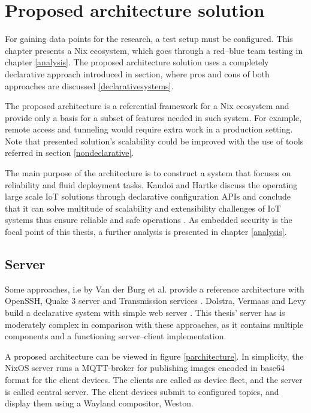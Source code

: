 \chapter{Proposed architecture solution} \label{architecture}

For gaining data points for the research, a test setup must be
configured. This chapter presents a Nix ecosystem, which goes through
a red–blue team testing in chapter \ref{analysis}. The proposed
architecture solution uses a completely declarative approach
introduced in section, where pros and cons of both approaches are
discussed \ref{declarativesystems}.

The proposed architecture is a referential framework for a Nix
ecosystem and provide only a basis for a subset of features needed in
such system. For example, remote access and tunneling would require
extra work in a production setting. Note that presented solution's
scalability could be improved with the use of tools referred in
section \ref{nondeclarative}.

The main purpose of the architecture is to construct a system that
focuses on reliability and fluid deployment tasks. Kandoi and Hartke
discuss the operating large scale IoT solutions through declarative
configuration APIs and conclude that it can solve multitude of
scalability and extensibility challenges of IoT systems thus ensure
reliable and safe operations \cite{kandoi2021operating}. As embedded
security is the focal point of this thesis, a further analysis is
presented in chapter \ref{analysis}.

\section{Server}

Some approaches, i.e by Van der Burg et al. provide a reference
architecture with OpenSSH, Quake 3 server and Transmission services
\cite{van2013reference}. Dolstra, Vermaas and Levy build a declarative
system with simple web server \cite{dolstra2013charon}. This thesis'
server has is moderately complex in comparison with these approaches,
as it contains multiple components and a functioning server–client
implementation.

A proposed architecture can be viewed in figure
\ref{parchitecture}. In simplicity, the NixOS server runs a
MQTT-broker for publishing images encoded in base64 format for the
client devices. The clients are called as device fleet, and the server
is called central server. The client devices submit to configured
topics, and display them using a Wayland compositor, Weston.

